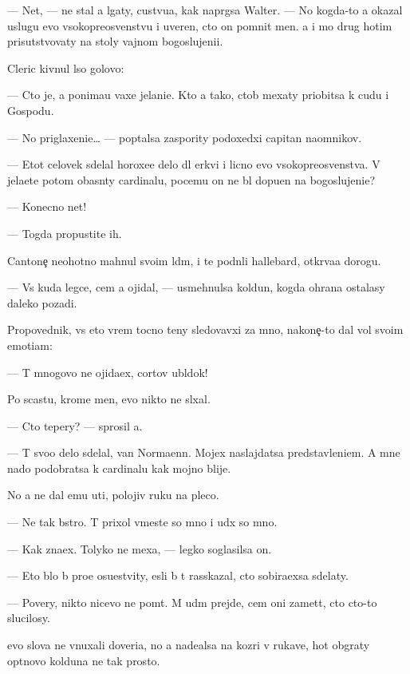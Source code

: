 \documentclass[10pt]{book}
\begin{document}
— Net, — ne stal {\y}a lgaty, custvu{\y}a, kak napr{\ia}gsa Walter. — No kogda-to {\y}a okazal uslugu {\y}evo v{\yi}sokopreosv{\ia}{\x}enstvu i uveren, cto on pomnit men{\ia}. {\Y}a i mo{\y} drug hotim prisutstvovaty na stoly vajnom bogoslujeni{\y}i.

Cleric kivnul l{\yi}so{\y} golovo{\y}:

— Cto je, {\y}a ponima{\y}u vaxe jelani{\y}e. Kto {\y}a tako{\y}, ctob{\yi} mexaty priob{\x}itsa k cudu i Gospodu.

— No priglaxeni{\y}e… — pop{\yi}talsa zaspority podoxedxi{\y} capitan na{\y}omnikov.

— Etot celovek sdelal horoxe{\y}e delo dl{\ia} {\C}erkvi i licno {\y}evo v{\yi}sokopreosv{\ia}{\x}enstva. V{\yi} jela{\y}ete potom ob{\y}asn{\ia}ty cardinalu, pocemu on ne b{\yi}l dopu{\x}en na bogoslujeni{\y}e?

— Konecno net!

— Togda propustite ih.

Cantone{\c} neohotno mahnul svo{\y}im l{\io}d{\ia}m, i te podn{\ia}li hallebard{\yi}, otkr{\yi}va{\y}a dorogu.

— Vs{\e} kuda legce, cem {\y}a ojidal, — usmehnulsa koldun, kogda ohrana ostalasy daleko pozadi.

Propovednik, vs{\e} eto vrem{\ia} tocno teny sledovavxi{\y} za mno{\y}, nakone{\c}-to dal vol{\io} svo{\y}im emoti{\y}am:

— T{\yi} mnogovo ne ojida{\y}ex, cortov ubl{\io}dok!

Po scast{\y}u, krome men{\ia}, {\y}evo nikto ne sl{\yi}xal.

— Cto tepery? — sprosil {\y}a.

— T{\yi} svo{\y}o delo sdelal, van Normaenn. Mojex naslajdatsa predstavleni{\y}em. A mne nado podobratsa k cardinalu kak mojno blije.

No {\y}a ne dal {\y}emu u{\y}ti, polojiv ruku na pleco.

— Ne tak b{\yi}stro. T{\yi} prixol vmeste so mno{\y} i u{\y}d{\e}x so mno{\y}.

— Kak zna{\y}ex. Tolyko ne mexa{\y}, — legko soglasilsa on.

— Eto b{\yi}lo b{\yi} pro{\x}e osu{\x}estvity, {\y}esli b{\yi} t{\yi} rasskazal, cto sobira{\y}exsa sdelaty.

— Povery, nikto nicevo ne po{\y}m{\e}t. M{\yi} u{\y}d{\e}m prejde, cem oni zamet{\ia}t, cto cto-to slucilosy.

{\Y}evo slova ne vnuxali doveri{\y}a, no {\y}a nade{\y}alsa na koz{\yi}ri v rukave, hot{\ia} ob{\yi}graty op{\yi}tnovo kolduna ne tak prosto.
\end{document}
